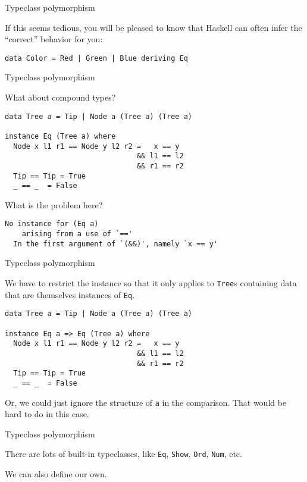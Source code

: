 %
\begin{frame}[fragile]{Typeclass polymorphism}

If this seems tedious, you will be pleased to know that Haskell can often infer
the ``correct'' behavior for you:

\begin{block}{}
\begin{verbatim}
data Color = Red | Green | Blue deriving Eq
\end{verbatim}
\end{block}

\end{frame}

%
\begin{frame}[fragile]{Typeclass polymorphism}

What about compound types?

\begin{block}{}
\begin{verbatim}
data Tree a = Tip | Node a (Tree a) (Tree a)

instance Eq (Tree a) where
  Node x l1 r1 == Node y l2 r2 =   x == y 
                               && l1 == l2 
                               && r1 == r2
  Tip == Tip = True
  _ == _  = False
\end{verbatim}
\end{block}

What is the problem here?

\begin{block}{}
\begin{verbatim}
No instance for (Eq a)
    arising from a use of `=='
  In the first argument of `(&&)', namely `x == y'
\end{verbatim}
\end{block}

\end{frame}

%
\begin{frame}[fragile]{Typeclass polymorphism}

We have to restrict the instance so that it only applies to \texttt{Tree}s
containing data that are themselves instances of \texttt{Eq}.

\begin{block}{}
\begin{verbatim}
data Tree a = Tip | Node a (Tree a) (Tree a)

instance Eq a => Eq (Tree a) where
  Node x l1 r1 == Node y l2 r2 =   x == y 
                               && l1 == l2 
                               && r1 == r2
  Tip == Tip = True
  _ == _  = False
\end{verbatim}
\end{block}

Or, we could just ignore the structure of \texttt{a} in the comparison. That
would be hard to do in this case.

\end{frame}

%
\begin{frame}[fragile]{Typeclass polymorphism}

There are lots of built-in typeclasses, like \texttt{Eq}, \texttt{Show},
\texttt{Ord}, \texttt{Num}, etc.

We can also define our own.

\end{frame}

